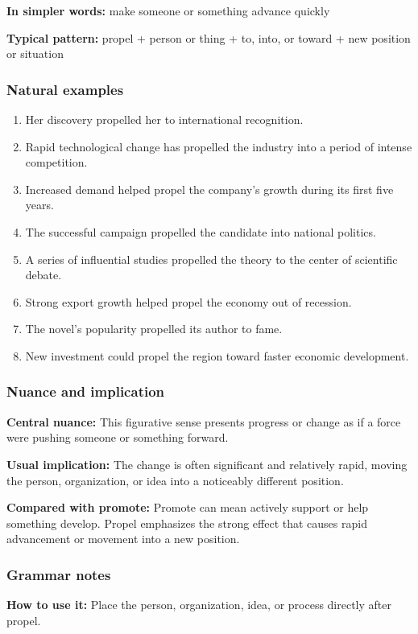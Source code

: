 \documentclass[11pt]{article}
\begin{document}
\textbf{In simpler words:} make someone or something advance quickly

\textbf{Typical pattern:} propel + person or thing + to, into, or toward + new position or situation

\subsubsection{Natural examples}
\begin{enumerate}
  \item Her discovery propelled her to international recognition.
  \item Rapid technological change has propelled the industry into a period of intense competition.
  \item Increased demand helped propel the company's growth during its first five years.
  \item The successful campaign propelled the candidate into national politics.
  \item A series of influential studies propelled the theory to the center of scientific debate.
  \item Strong export growth helped propel the economy out of recession.
  \item The novel's popularity propelled its author to fame.
  \item New investment could propel the region toward faster economic development.
\end{enumerate}

\subsubsection{Nuance and implication}
\textbf{Central nuance:} This figurative sense presents progress or change as if a force were pushing someone or something forward.

\textbf{Usual implication:} The change is often significant and relatively rapid, moving the person, organization, or idea into a noticeably different position.

\textbf{Compared with promote:} Promote can mean actively support or help something develop. Propel emphasizes the strong effect that causes rapid advancement or movement into a new position.

\subsubsection{Grammar notes}
\textbf{How to use it:} Place the person, organization, idea, or process directly after propel.
\end{document}
